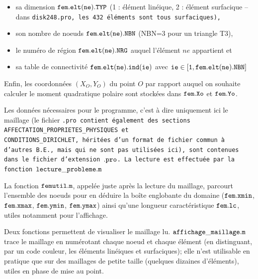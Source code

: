 \documentclass[a4paper, 10pt]{article}
\newcommand{\matlabscript}[2]
  {\begin{itemize}\item[]\end{itemize}}
\begin{document}
\begin{itemize}
\renewcommand\labelitemi{\textbullet}
\item sa dimension $\tt{fem.elt(ne).TYP} \rm$ (1 : élément linéique, 2 : élément surfacique -- dans \tt{disk248.pro}\rm, les 432 éléments sont tous surfaciques),
\item  son nombre de noeuds $\tt{fem.elt(ne).NBN} \rm$ (NBN=3 pour un triangle T3),
\item le numéro de région $\tt{fem.elt(ne).NRG} \rm$ auquel l'élément $ne$ appartient  et
\item  sa table de connectivité $\tt{fem.elt(ne).ind(ie)} \rm$ avec $\tt{ie \in [1,   fem.elt(ne).NBN \rm]}$
\end{itemize} 

Enfin, les coordonnées $(X_O, Y_O)$ du point $O$ par rapport auquel on souhaite calculer le
moment quadratique polaire sont stockées dans $\tt{fem.Xo}\rm$ et $\tt{fem.Yo}\rm$.

Les données nécessaires pour le programme, c'est à dire uniquement ici le maillage (le fichier
\tt{.pro}\rm{} contient également des sections \tt{AFFECTATION\_PROPRIETES\_PHYSIQUES}  et \\
\tt{CONDITIONS\_DIRICHLET}\rm{}, héritées d'un format de fichier commun à d'autres B.E., mais qui
ne sont pas utilisées ici), sont contenues dans le fichier d'extension $\tt{.pro} \rm$. La
lecture est effectuée par la fonction $\tt{lecture\_probleme.m} \rm$


La fonction $\tt{femutil.m}\rm$, appelée juste après la lecture du maillage, parcourt l'ensemble
des noeuds pour en déduire la boîte englobante du domaine ($\tt{fem.xmin}\rm$,
$\tt{fem.xmax}\rm$, $\tt{fem.ymin}\rm$, $\tt{fem.ymax}\rm$) ainsi qu'une longueur caractéristique
$\tt{fem.lc}\rm$, utiles notamment pour l'affichage.


Deux fonctions permettent de visualiser le maillage lu. $\tt{affichage\_maillage.m}\rm$ trace le
maillage en numérotant chaque noeud et chaque élément (en distinguant, par un code couleur, les
éléments linéiques et surfaciques); elle n'est utilisable en pratique que sur des maillages de
petite taille (quelques dizaines d'éléments), utiles en phase de mise au point.

\end{document}
